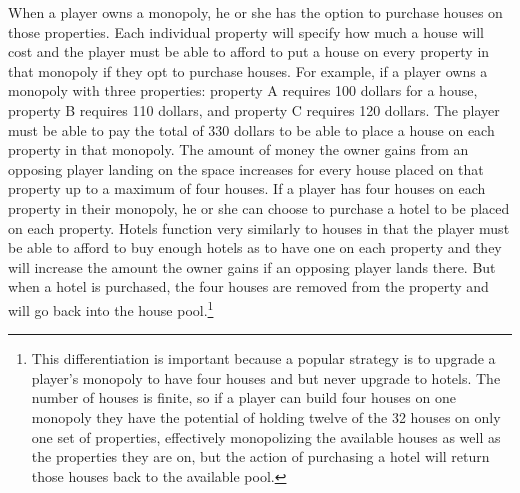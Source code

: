 \documentclass{article}
\begin{document}
When a player owns a monopoly, he or she has the option to purchase houses on those properties.  Each individual property will specify how much a house will cost and the player must be able to afford to put a house on every property in that monopoly if they opt to purchase houses.  For example, if a player owns a monopoly with three properties: property A requires 100 dollars for a house, property B requires 110 dollars, and property C requires 120 dollars.  The player must be able to pay the total of 330 dollars to be able to place a house on each property in that monopoly.  The amount of money the owner gains from an opposing player landing on the space increases for every house placed on that property up to a maximum of four houses.  If a player has four houses on each property in their monopoly, he or she can choose to purchase a hotel to be placed on each property.  Hotels function very similarly to houses in that the player must be able to afford to buy enough hotels as to have one on each property and they will increase the amount the owner gains if an opposing player lands there. But when a hotel is purchased, the four houses are removed from the property and will go back into the house pool.\footnote{This differentiation is important because a popular strategy is to upgrade a player's monopoly to have four houses and but never upgrade to hotels.  The number of houses is finite, so if a player can build four houses on one monopoly they have the potential of holding twelve of the 32 houses on only one set of properties, effectively monopolizing the available houses as well as the properties they are on, but the action of purchasing a hotel will return those houses back to the available pool.} 
\end{document}
